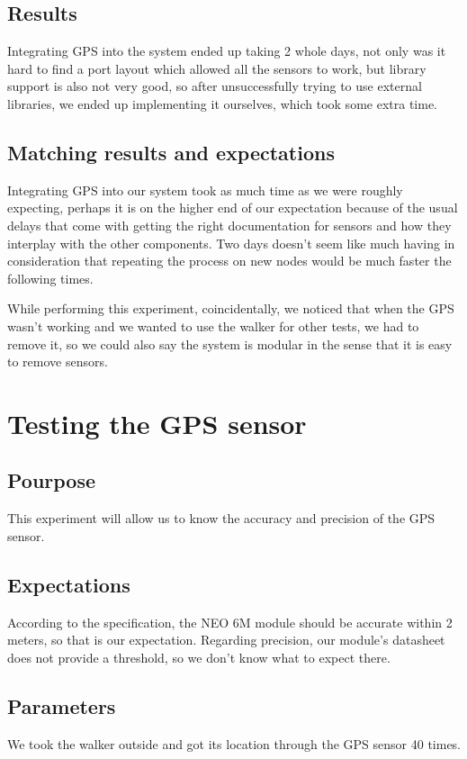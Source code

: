 	\subsection{Results}
	Integrating GPS into the system ended up taking 2 whole days, not only was it hard to find a port layout which allowed all the sensors to work, but library support is also not very good, so after unsuccessfully trying to use external libraries, we ended up implementing it ourselves, which took some extra time.

	\subsection{Matching results and expectations}
	Integrating GPS into our system took as much time as we were roughly expecting, perhaps it is on the higher end of our expectation because of the usual delays that come with getting the right documentation for sensors and how they interplay with the other components. Two days doesn't seem like much having in consideration that repeating the process on new nodes would be much faster the following times.

	While performing this experiment, coincidentally, we noticed that when the GPS wasn't working and we wanted to use the walker for other tests, we had to remove it, so we could also say the system is modular in the sense that it is easy to remove sensors.

\section{Testing the GPS sensor}

	\subsection{Pourpose}
		This experiment will allow us to know the accuracy and precision of the GPS sensor.
	\subsection{Expectations}
		According to the specification, the NEO 6M module should be accurate within 2 meters, so that is our expectation. Regarding precision, our module's datasheet does not provide a threshold, so we don't know what to expect there.

	\subsection{Parameters}
		We took the walker outside and got its location through the GPS sensor 40 times.

